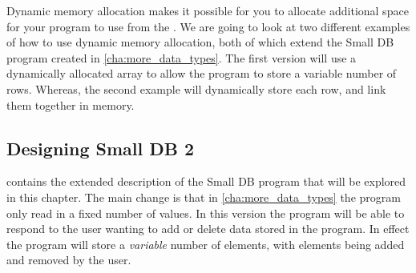 Dynamic memory allocation makes it possible for you to allocate additional space for your program to use from the . We are going to look at two different examples of how to use dynamic memory allocation, both of which extend the Small DB program created in \cref{cha:more_data_types}. The first version will use a dynamically allocated array to allow the program to store a variable number of rows. Whereas, the second example will dynamically store each row, and link them together in memory. 

\subsection{Designing Small DB 2} %
\label{sub:designing_small_db_2}

 contains the extended description of the Small DB program that will be explored in this chapter. The main change is that in \cref{cha:more_data_types} the program only read in a fixed number of values. In this version the program will be able to respond to the user wanting to add or delete data stored in the program. In effect the program will store a \emph{variable} number of elements, with elements being added and removed by the user.


